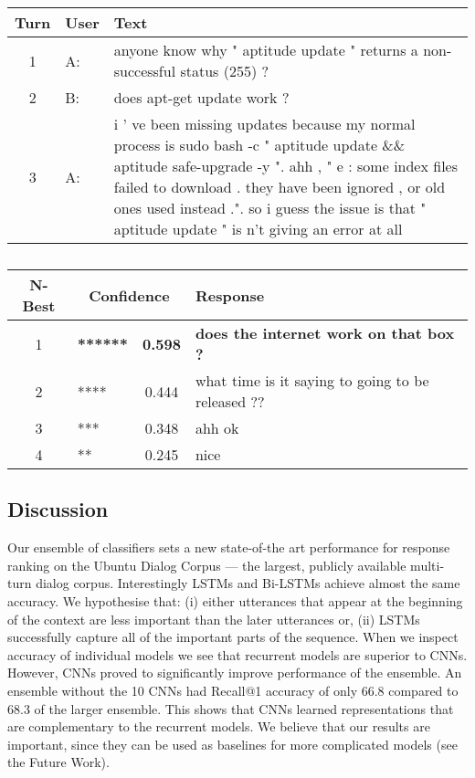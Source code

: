 \documentclass{article} \usepackage{nips15submit_e,times}
\begin{document}
\begin{table}[h!]
\centering
\begin{tabular}{c|l|p{11cm}}

Turn & User & Text \\ \hline
1	& A: &	 anyone know why " aptitude update " returns a non-successful status (255) ? \\		
2	& B: &	  does apt-get update work ? \\		
3	& A: &	  i ' ve been missing updates because my normal process is sudo bash -c " aptitude update \&\& aptitude safe-upgrade -y ". ahh , " e : some index files failed to download . they have been ignored , or old ones used instead .". so i guess the issue is that " aptitude update " is n't giving an error at all \\		
\end{tabular}

\baselineskip
\begin{tabular}{c|l|c|p{8cm}}
N-Best	& \multicolumn{2}{c|}{Confidence} & Response\\		\hline	
1	& 	 \textbf{******} &	\textbf{0.598}	& \textbf{does the internet work on that box ?} \\
2	&  	 **** &	0.444	& what time is it saying to going to be released ?? \\
3	&  	 *** &	0.348	& ahh ok \\
4	&  	 ** &	0.245	& nice \\
\end{tabular}
\caption{}
\label{tbl-dialog}
\end{table}

\subsection{Discussion}

Our ensemble of classifiers sets a new state-of-the art performance for response ranking on the Ubuntu Dialog Corpus --- the largest, publicly available multi-turn dialog corpus. Interestingly LSTMs and Bi-LSTMs achieve almost the same accuracy. We hypothesise that: (i) either utterances that appear at the beginning of the context are less important than the later utterances or, (ii) LSTMs successfully capture all of the important parts of the sequence. When we inspect accuracy of individual models we see that recurrent models are superior to CNNs. However, CNNs proved to significantly improve performance of the ensemble. An ensemble without the 10 CNNs had Recall@1 accuracy of only 66.8 compared to 68.3 of the larger ensemble. This shows that CNNs learned representations that are complementary to the recurrent models.
We believe that our results are important, since they can be used as baselines for more complicated models (see the Future Work).
\end{document}
